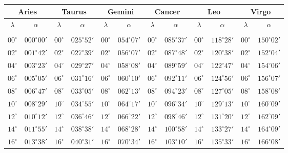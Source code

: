 \clearpage
\begin{table}[!h]
\vspace{0.25cm}
\centering
{\scriptsize \begin{tabular}{cc|cc|cc|cc|cc|cc}
\multicolumn{2}{c}{Aries}\vline & \multicolumn{2}{c}{Taurus} \vline& \multicolumn{2}{c}{Gemini} \vline& \multicolumn{2}{c}{Cancer}\vline &
\multicolumn{2}{c}{Leo}\vline & \multicolumn{2}{c}{Virgo}\\\hline
$\lambda$& $\alpha$& $\lambda$& $\alpha$& $\lambda$& $\alpha$& $\lambda$& $\alpha$& $\lambda$& $\alpha$& $\lambda$& $\alpha$\\\hline
&&&&&&&&&&&\\[-2ex]
$00^\circ$ & $000^\circ00'$ & $00^\circ$ & $025^\circ52'$ & $00^\circ$ & $054^\circ07'$ & $00^\circ$ & $085^\circ37'$ & $00^\circ$ & $118^\circ28'$ & $00^\circ$ & $150^\circ02'$\\
$02^\circ$ & $001^\circ42'$ & $02^\circ$ & $027^\circ39'$ & $02^\circ$ & $056^\circ07'$ & $02^\circ$ & $087^\circ48'$ & $02^\circ$ & $120^\circ38'$ & $02^\circ$ & $152^\circ04'$\\
$04^\circ$ & $003^\circ23'$ & $04^\circ$ & $029^\circ27'$ & $04^\circ$ & $058^\circ08'$ & $04^\circ$ & $089^\circ59'$ & $04^\circ$ & $122^\circ47'$ & $04^\circ$ & $154^\circ06'$\\
$06^\circ$ & $005^\circ05'$ & $06^\circ$ & $031^\circ16'$ & $06^\circ$ & $060^\circ10'$ & $06^\circ$ & $092^\circ11'$ & $06^\circ$ & $124^\circ56'$ & $06^\circ$ & $156^\circ07'$\\
$08^\circ$ & $006^\circ47'$ & $08^\circ$ & $033^\circ05'$ & $08^\circ$ & $062^\circ13'$ & $08^\circ$ & $094^\circ23'$ & $08^\circ$ & $127^\circ05'$ & $08^\circ$ & $158^\circ08'$\\
$10^\circ$ & $008^\circ29'$ & $10^\circ$ & $034^\circ55'$ & $10^\circ$ & $064^\circ17'$ & $10^\circ$ & $096^\circ34'$ & $10^\circ$ & $129^\circ13'$ & $10^\circ$ & $160^\circ09'$\\
$12^\circ$ & $010^\circ12'$ & $12^\circ$ & $036^\circ46'$ & $12^\circ$ & $066^\circ22'$ & $12^\circ$ & $098^\circ46'$ & $12^\circ$ & $131^\circ20'$ & $12^\circ$ & $162^\circ09'$\\
$14^\circ$ & $011^\circ55'$ & $14^\circ$ & $038^\circ38'$ & $14^\circ$ & $068^\circ28'$ & $14^\circ$ & $100^\circ58'$ & $14^\circ$ & $133^\circ27'$ & $14^\circ$ & $164^\circ09'$\\
$16^\circ$ & $013^\circ38'$ & $16^\circ$ & $040^\circ31'$ & $16^\circ$ & $070^\circ34'$ & $16^\circ$ & $103^\circ10'$ & $16^\circ$ & $135^\circ33'$ & $16^\circ$ & $166^\circ08'$\\

\end{tabular}}
\end{table}
